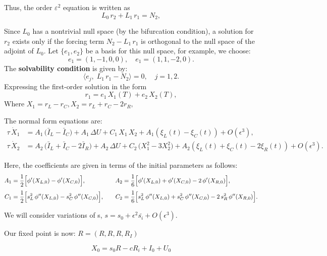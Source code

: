 \documentclass[ENG]{fancynotes}
\begin{document}
Thus, the order \(\varepsilon^2\) equation is written as
\begin{equation}
  L_0\,r_2 + L_1\,r_1 = N_2,
  \label{eq:order2_eq}
\end{equation}


Since \(L_0\) has a nontrivial null space (by the bifurcation condition), a solution for \(r_2\) exists only if the forcing term \(N_2 - L_1\,r_1\) is orthogonal to the null space of the adjoint of \(L_0\). Let \(\{e_1,e_2\}\) be a basis for this null space, for example, we choose:
\[
e_1 = (1, -1, 0, 0), \quad e_1 = (1, 1, -2, 0).
\]
The \textbf{solvability condition} is given by:
\begin{equation}
  \langle e_j,\; L_1\,r_1 - N_2 \rangle = 0,\quad j=1,2.
  \label{eq:solvability_cond}
\end{equation}
Expressing the first-order solution in the form
\[
r_1 = e_1\,X_1(T) + e_2\,X_2(T),
\]
Where $X_1 = r_L-r_C, X_2 =  r_L+r_C-2r_R, $

The normal form equations are:
\begin{align}
  \tau\,\dot{X}_1 &= A_1\,\bigl(\bar{I}_L - \bar{I}_C\bigr) + A_1\,\Delta U + C_1\,X_1\,X_2 + A_1 (\xi_L(t)-\xi_C(t)) + O(\epsilon^3), \label{eq:normal_form1}\\[2mm]
  \tau\,\dot{X}_2 &= A_2\,\bigl(\bar{I}_L + \bar{I}_C - 2\bar{I}_R\bigr) + A_2\,\Delta U + C_2\,\bigl(X_1^2 - 3X_2^2\bigr) +  A_2(\xi_L(t)+\xi_C(t)-2\xi_R(t)) + O(\epsilon^3). \label{eq:normal_form2}
\end{align}

Here, the coefficients are given in terms of the initial parameters as follows:
\[
\begin{aligned}
A_1 &= \frac{1}{2}\Bigl[\phi'(X_{L,0}) - \phi'(X_{C,0})\Bigr], \quad
& A_2 &= \frac{1}{6}\Bigl[\phi'(X_{L,0}) + \phi'(X_{C,0}) - 2\,\phi'(X_{R,0})\Bigr],\\[1mm]
C_1 &= \frac{1}{2}\Bigl[s_L^2\,\phi''(X_{L,0}) - s_C^2\,\phi''(X_{C,0})\Bigr], \quad
& C_2 &= \frac{1}{6}\Bigl[s_L^2\,\phi''(X_{L,0}) + s_C^2\,\phi''(X_{C,0}) - 2\,s_R^2\,\phi''(X_{R,0})\Bigr].
\end{aligned}
\]

\bigskip
\noindent

We will consider variations of s,  $s = s_0 +\epsilon^2 \bar{s_i} + O(\epsilon^3)$. 

Our fixed point is now: $R = (R, R, R, R_I)$



\begin{equation}
X_0 = s_0 R - c R_i +I_0 + U_0
\end{equation}
\end{document}
